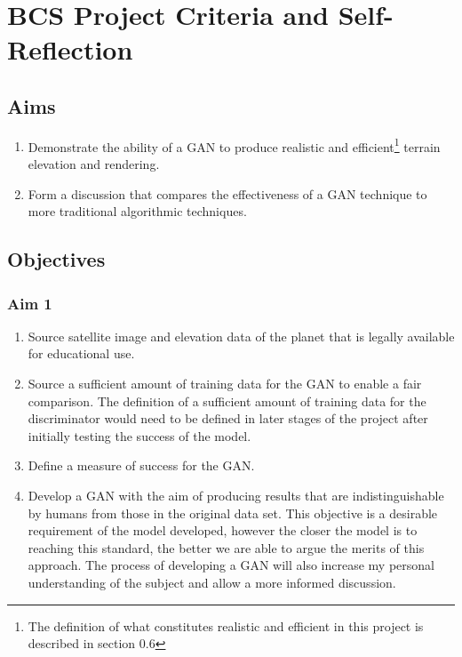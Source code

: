 \documentclass[a4paper]{report}
\begin{document}
\section{BCS Project Criteria and Self-Reflection}
\renewcommand\bibname{References}


\begin{appendices}
\subsection{Aims}
\begin{enumerate}
    \item Demonstrate the ability of a GAN to produce realistic and efficient\footnote{The definition of what constitutes realistic and efficient in this project is described in section 0.6} terrain elevation and rendering.
    \item Form a discussion that compares the effectiveness of a GAN technique to more traditional algorithmic techniques.
\end{enumerate}
\subsection{Objectives}
\subsubsection{Aim 1}
\begin{enumerate}
\renewcommand{\theenumi}{\alph{enumi}}
    \item Source satellite image and elevation data of the planet that is legally available for educational use.
    \item Source a sufficient amount of training data for the GAN to enable a fair comparison. The definition of a sufficient amount of training data for the discriminator would need to be defined in later stages of the project after initially testing the success of the model.
    \item Define a measure of success for the GAN.
    \item Develop a GAN with the aim of producing results that are indistinguishable by humans from those in the original data set. This objective is a desirable requirement of the model developed, however the closer the model is to reaching this standard, the better we are able to argue the merits of this approach. The process of developing a GAN will also increase my personal understanding of the subject and allow a more informed discussion.
\end{enumerate}

\end{appendices}
\end{document}
